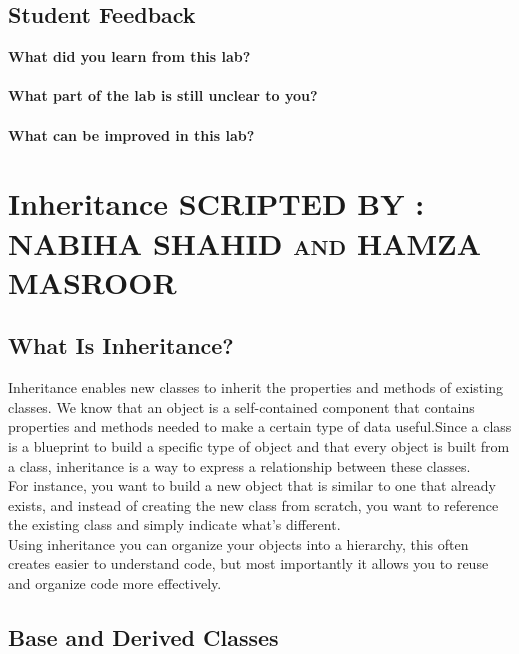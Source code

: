 \documentclass[11pt,fleqn]{book} %
\begin{document}
\newpage
\section{Student Feedback}
\textbf{What did you learn from this lab?}\\
\noindent\fbox{\parbox{\textwidth}{
  }
}\\
\textbf{What part of the lab is still unclear to you?}\\
\noindent\fbox{\parbox{\textwidth}{
  }
}\\
\textbf{What can be improved in this lab?}\\ 
\noindent\fbox{\parbox{\textwidth}{
  }
}

\newpage


\chapter{Inheritance \hspace{65mm} {\textsc{\small SCRIPTED BY : NABIHA SHAHID and HAMZA MASROOR}}}

\section{What Is Inheritance?}

Inheritance enables new classes to inherit the properties and methods of existing classes. We know that an object is a self-contained component that contains properties and methods needed to make a certain type of data useful.Since a class is a blueprint to build a specific type of object and that every object is built from a class, inheritance is a way to express a relationship between these classes.\\
For instance, you want to build a new object that is similar to one that already exists, and instead of creating the new class from scratch, you want to reference the existing class and simply indicate what's different.\\
Using inheritance you can organize your objects into a hierarchy, this often creates easier to understand code, but most importantly it allows you to reuse and organize code more effectively.

\section{Base and Derived Classes}
\end{document}

